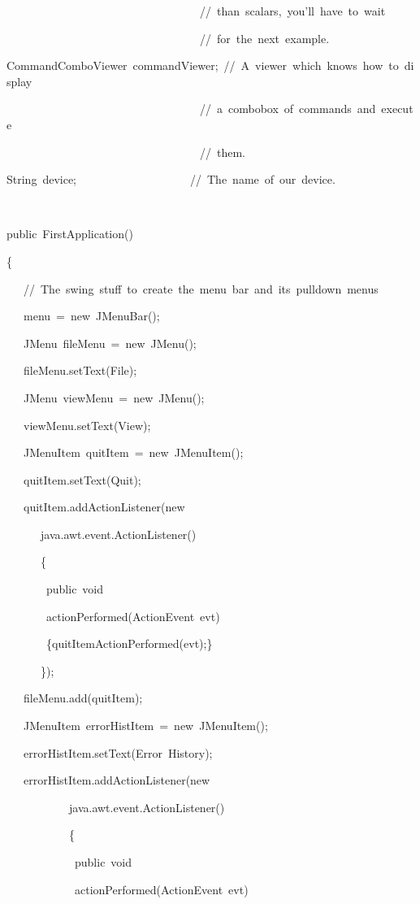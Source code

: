 \begin{lyxcode}
~~~~~~~~~~~~~~~~~~~~~~~~~~~~~~~~~~//~than~scalars,~you'll~have~to~wait

~~~~~~~~~~~~~~~~~~~~~~~~~~~~~~~~~~//~for~the~next~example.

CommandComboViewer~commandViewer;~//~A~viewer~which~knows~how~to~display

~~~~~~~~~~~~~~~~~~~~~~~~~~~~~~~~~~//~a~combobox~of~commands~and~execute

~~~~~~~~~~~~~~~~~~~~~~~~~~~~~~~~~~//~them.

String~device;~~~~~~~~~~~~~~~~~~~~//~The~name~of~our~device.

~

public~FirstApplication()

\{

~~~//~The~swing~stuff~to~create~the~menu~bar~and~its~pulldown~menus

~~~menu~=~new~JMenuBar();

~~~JMenu~fileMenu~=~new~JMenu();

~~~fileMenu.setText(\textquotedbl{}File\textquotedbl{});~~~

~~~JMenu~viewMenu~=~new~JMenu();

~~~viewMenu.setText(\textquotedbl{}View\textquotedbl{});

~~~JMenuItem~quitItem~=~new~JMenuItem();

~~~quitItem.setText(\textquotedbl{}Quit\textquotedbl{});

~~~quitItem.addActionListener(new~

~~~~~~java.awt.event.ActionListener()

~~~~~~\{~~~~~~~~~~~~~~~~~

~~~~~~~public~void

~~~~~~~actionPerformed(ActionEvent~evt)

~~~~~~~\{quitItemActionPerformed(evt);\}

~~~~~~\});

~~~fileMenu.add(quitItem);

~~~JMenuItem~errorHistItem~=~new~JMenuItem();

~~~errorHistItem.setText(\textquotedbl{}Error~History\textquotedbl{});

~~~errorHistItem.addActionListener(new~

~~~~~~~~~~~java.awt.event.ActionListener()

~~~~~~~~~~~\{~~~~~~~~~~~~~~~~~

~~~~~~~~~~~~public~void~

~~~~~~~~~~~~actionPerformed(ActionEvent~evt)


\end{lyxcode}
